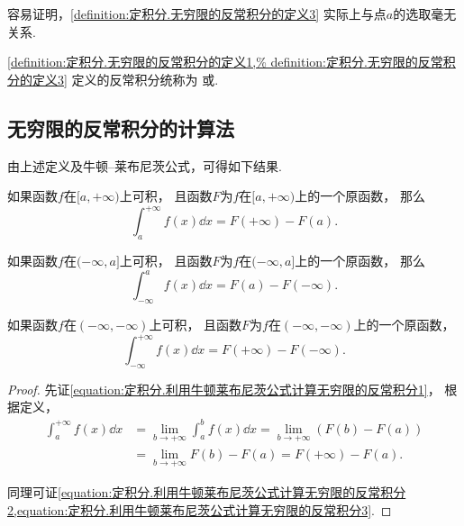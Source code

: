 容易证明，\cref{definition:定积分.无穷限的反常积分的定义3} 实际上与点\(a\)的选取毫无关系.

\cref{definition:定积分.无穷限的反常积分的定义1,%
definition:定积分.无穷限的反常积分的定义3}
定义的反常积分统称为%
或.

\subsection{无穷限的反常积分的计算法}
由上述定义及牛顿--莱布尼茨公式，可得如下结果.
\begin{theorem}\label{theorem:定积分.利用牛顿莱布尼茨公式计算无穷限的反常积分}
如果函数\(f\)在\([a,+\infty)\)上可积，
且函数\(F\)为\(f\)在\([a,+\infty)\)上的一个原函数，
那么\begin{equation}\label{equation:定积分.利用牛顿莱布尼茨公式计算无穷限的反常积分1}
	\int_a^{+\infty} f(x) \dd{x}
	= F(+\infty) - F(a).
\end{equation}

如果函数\(f\)在\((-\infty,a]\)上可积，
且函数\(F\)为\(f\)在\((-\infty,a]\)上的一个原函数，
那么\begin{equation}\label{equation:定积分.利用牛顿莱布尼茨公式计算无穷限的反常积分2}
	\int_{-\infty}^a f(x) \dd{x}
	= F(a) - F(-\infty).
\end{equation}

如果函数\(f\)在\((-\infty,-\infty)\)上可积，
且函数\(F\)为\(f\)在\((-\infty,-\infty)\)上的一个原函数，
\begin{equation}\label{equation:定积分.利用牛顿莱布尼茨公式计算无穷限的反常积分3}
	\int_{-\infty}^{+\infty} f(x) \dd{x}
	= F(+\infty) - F(-\infty).
\end{equation}
\begin{proof}
先证\cref{equation:定积分.利用牛顿莱布尼茨公式计算无穷限的反常积分1}，
根据定义，\begin{align*}
	\int_a^{+\infty} f(x) \dd{x}
	&= \lim_{b\to+\infty} \int_a^b f(x) \dd{x}
	= \lim_{b\to+\infty} (F(b) - F(a)) \\
	&= \lim_{b\to+\infty} F(b) - F(a)
	= F(+\infty) - F(a).
\end{align*}

同理可证\cref{equation:定积分.利用牛顿莱布尼茨公式计算无穷限的反常积分2,equation:定积分.利用牛顿莱布尼茨公式计算无穷限的反常积分3}.
\end{proof}
\end{theorem}

